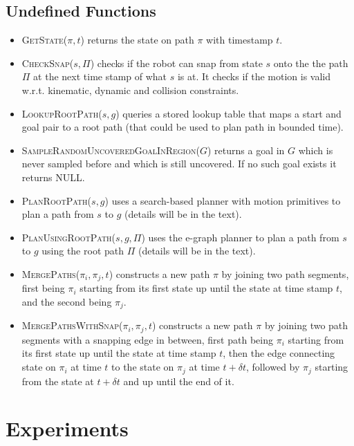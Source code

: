 \subsection*{Undefined Functions}
\begin{itemize}
  \item \textsc{GetState}($\pi,t$) returns the state on path $\pi$ with timestamp $t$.
  \item \textsc{CheckSnap}($s,\Pi$) checks if the robot can snap from state $s$ onto the the path $\Pi$ at the next time stamp of what $s$ is at. It checks if the motion is valid w.r.t. kinematic, dynamic and collision constraints.
  \item \textsc{LookupRootPath}($s,g$) queries a stored lookup table that maps a start and goal pair to a root path (that could be used to plan path in bounded time).
  \item \textsc{SampleRandomUncoveredGoalInRegion}($G$) returns a goal in $G$ which is never sampled before and which is still uncovered. If no such goal exists it returns NULL.
  \item \textsc{PlanRootPath}($s,g$) uses a search-based planner with motion primitives to plan a path from $s$ to $g$ (details will be in the text).
  \item \textsc{PlanUsingRootPath}($s,g,\Pi$) uses the e-graph planner to plan a path from $s$ to $g$ using the root path $\Pi$ (details will be in the text).
  \item \textsc{MergePaths}($\pi_i,\pi_j,t$) constructs a new path $\pi$ by joining two path segments, first being $\pi_i$ starting from its first state up until the state at time stamp $t$, and the second being $\pi_j$.
  \item \textsc{MergePathsWithSnap}($\pi_i,\pi_j,t$) constructs a new path $\pi$ by joining two path segments with a snapping edge in between, first path being $\pi_i$ starting from its first state up until the state at time stamp $t$, then the edge connecting state on $\pi_i$ at time $t$ to the state on $\pi_j$ at time $t + \delta t$, followed by $\pi_j$ starting from the state at $t + \delta t$ and up until the end of it.
\end{itemize}

\section{Experiments}
